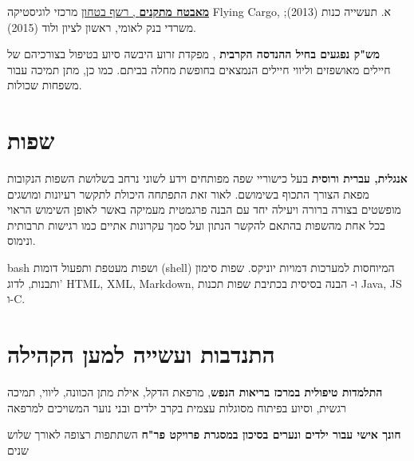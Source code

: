 {\href{https://www.dropbox.com/s/kr5rcui1zgp35i0/recommendation-letter-security-guard.jpg?dl=0}{\textbf{מאבטח מתקנים} , רשף בטחון}}
{מרכזי לוגיסטיקה Flying Cargo, א. תעשייה כנות (2013); משרדי בנק לאומי, ראשון לציון ולוד (2015).}
{}

{\textbf{מש"ק נפגעים בחיל ההנדסה הקרבית} , מפקדת זרוע היבשה}
{סיוע בטיפול בצורכיהם של חיילים מאושפזים וליווי חיילים הנמצאים בחופשת מחלה בביתם. כמו כן, מתן תמיכה עבור משפחות שכולות.}
{}

\section{שפות}

{\textbf{אנגלית, עברית ורוסית}}
{בעל כישוריי שפה מפותחים וידע לשוני נרחב בשלושת השפות הנקובות מפאת הצורך התכוף בשימושם. לאור זאת התפתחה היכולת לתקשר רעיונות ומושגים מופשטים בצורה ברורה ויעילה יחד עם הבנה פרגמטית מעמיקה באשר לאופן השימוש הראוי בכל אחת מהשפות בהתאם להקשר הנתון ועל סמך עקרונות אתיים כמו רגישות תרבותית ונימוס.} 
{}

{bash
ושפות מעטפת ותפעול דומות (shell) המיוחסות למערכות דמויות יוניקס. שפות סימון ותבנות, לדוג' HTML, XML, Markdown, ו- 
\setLTR{\LaTex}
הבנה בסיסית בכתיבת שפות תכנות Java, JS ו-C.}
{}

\section{התנדבות ועשייה למען הקהילה}

{\textbf{התלמדות טיפולית במרכז בריאות הנפש}, מרפאת הדקל, אילת}
{מתן הכוונה, ליווי, תמיכה רגשית, וסיוע בפיתוח מסוגלות עצמית בקרב ילדים ובני נוער המשויכים למרפאה}
{}

{\textbf{חונך אישי עבור ילדים ונערים בסיכון במסגרת פרויקט פר"ח}}
{השתתפות רצופה לאורך שלוש שנים}
{}		
\unsetRTL
